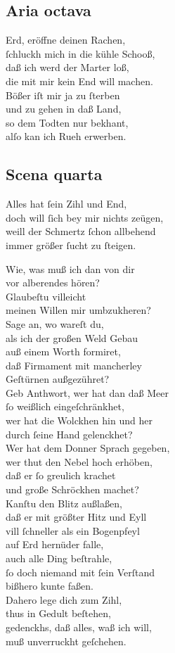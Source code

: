 \documentclass{ees}
\newenvironment{lyrics}[1]{%
  \subsection{#1}\nopagebreak%
  \begin{lyricslist}%
  \let\voice\item%
}{%
  \end{lyricslist}%
}
\begin{document}
\begin{lyrics}{Aria octava}
  \voice[Jobs Frau]
  Erd, eröffne deinen Rachen,\\
  ſchluckh mich in die kühle Schooß,\\
  daß ich werd der Marter loß,\\
  die mit mir kein End will machen.\\[1ex]
  Bößer iſt mir ja zu ſterben\\
  und zu gehen in daß Land,\\
  so dem Todten nur bekhant,\\
  alſo kan ich Rueh erwerben.
\end{lyrics}

\begin{lyrics}{Scena quarta}
  \voice[Job]
  Alles hat ſein Zihl und End,\\
  doch will ſich bey mir nichts zeügen,\\
  weill der Schmertz ſchon allbehend\\
  immer größer ſucht zu ſteigen.

  \voice[Schöpffer]
  Wie, was muß ich dan von dir\\
  vor alberendes hören?\\
  Glaubeſtu villeicht\\
  meinen Willen mir umbzukheren?\\
  Sage an, wo wareſt du,\\
  als ich der großen Weld Gebau\\
  auß einem Worth formiret,\\
  daß Firmament mit mancherley\\
  Geſtürnen außgezühret?\\
  Geb Anthwort, wer hat dan daß Meer\\
  ſo weißlich eingeſchränkhet,\\
  wer hat die Wolckhen hin und her\\
  durch ſeine Hand gelenckhet?\\
  Wer hat dem Donner Sprach gegeben,\\
  wer thut den Nebel hoch erhöben,\\
  daß er ſo greulich krachet\\
  und große Schröckhen machet?\\
  Kanſtu den Blitz außlaßen,\\
  daß er mit größter Hitz und Eyll\\
  vill ſchneller als ein Bogenpfeyl\\
  auf Erd hernüder falle,\\
  auch alle Ding beſtrahle,\\
  ſo doch niemand mit ſein Verſtand\\
  bißhero kunte faßen.\\
  Dahero lege dich zum Zihl,\\
  thus in Gedult beſtehen,\\
  gedenckhs, daß alles, waß ich will,\\
  muß unverruckht geſchehen.


\end{lyrics}
\end{document}
